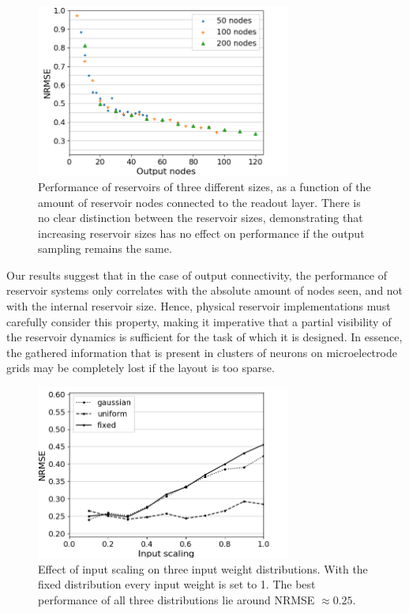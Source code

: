 \begin{figure}[t!]
  \centering
  \includegraphics[width=3.3in]{img/output_nodes.png}
  \caption{
    Performance of reservoirs of three different sizes, as a function of the
amount of reservoir nodes connected to the readout layer. There is no clear
distinction between the reservoir sizes, demonstrating that increasing reservoir
sizes has no effect on performance if the output sampling remains the same.
  }
  \label{output_nodes}
\end{figure}

Our results suggest that in the case of output connectivity, the performance of
reservoir systems only correlates with the absolute amount of nodes seen, and
not with the internal reservoir size. Hence, physical reservoir implementations
must carefully consider this property, making it imperative that a partial
visibility of the reservoir dynamics is sufficient for the task of which it is
designed. In essence, the gathered information that is present in clusters of
neurons on microelectrode grids may be completely lost if the layout is too
sparse.

\begin{figure}[t!]
  \centering
  \includegraphics[width=3.3in]{img/input_scaling_distrib.png}
  \caption{
    Effect of input scaling on three input weight distributions. With the fixed
distribution every input weight is set to 1. The best performance of all three
distributions lie around NRMSE $\approx 0.25$.
  }
  \label{input_scaling_distrib}
\end{figure}

